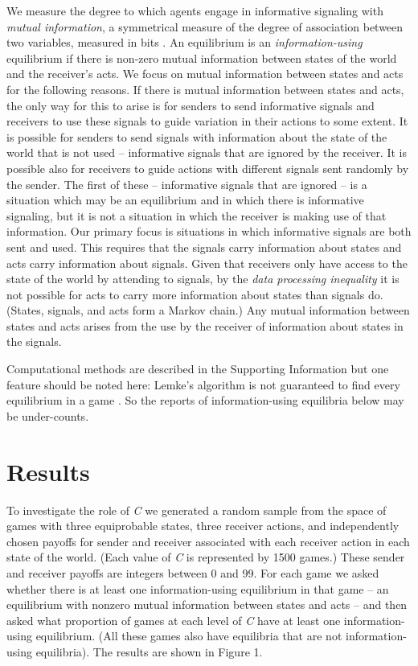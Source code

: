 \documentclass[10pt]{article}
\begin{document}
We measure the degree to which agents engage in informative signaling
with \emph{mutual information}, a symmetrical measure of the degree of
association between two variables, measured in bits \cite[p.~7]{Cover2006}. An equilibrium is an
\emph{information-using} equilibrium if there is non-zero mutual
information between states of the world and the receiver's acts. We
focus on mutual information between states and acts for the following
reasons. If there is mutual information between states and acts, the
only way for this to arise is for senders to send informative signals
and receivers to use these signals to guide variation in their actions
to some extent. It is possible for senders to send signals with
information about the state of the world that is not used -- informative
signals that are ignored by the receiver. It is possible also for
receivers to guide actions with different signals sent randomly by the
sender. The first of these -- informative signals that are ignored -- is
a situation which may be an equilibrium and in which there is
informative signaling, but it is not a situation in which the receiver
is making use of that information. Our primary focus is situations in
which informative signals are both sent and used. This requires that the
signals carry information about states and acts carry information about
signals. Given that receivers only have access to the state of the world
by attending to signals, by the \emph{data processing inequality} \cite{Cover2006}
it is not possible for acts to carry more information about states than
signals do. (States, signals, and acts form a Markov chain.) Any mutual
information between states and acts arises from the use by the receiver
of information about states in the signals.

Computational methods are described in the Supporting Information but
one feature should be noted here: Lemke's algorithm is not guaranteed to
find every equilibrium in a game \cite{Koller1996}. So the reports of
information-using equilibria below may be under-counts.

\section*{Results}

To investigate the role of \emph{C} we generated a random sample from
the space of games with three equiprobable states, three receiver
actions, and independently chosen payoffs for sender and receiver
associated with each receiver action in each state of the world. (Each
value of \emph{C} is represented by 1500 games.) These sender and
receiver payoffs are integers between 0 and 99. For each game we asked
whether there is at least one information-using equilibrium in that game
-- an equilibrium with nonzero mutual information between states and
acts -- and then asked what proportion of games at each level of
\emph{C} have at least one information-using equilibrium. (All these
games also have equilibria that are not information-using equilibria).
The results are shown in Figure 1.
\end{document}
